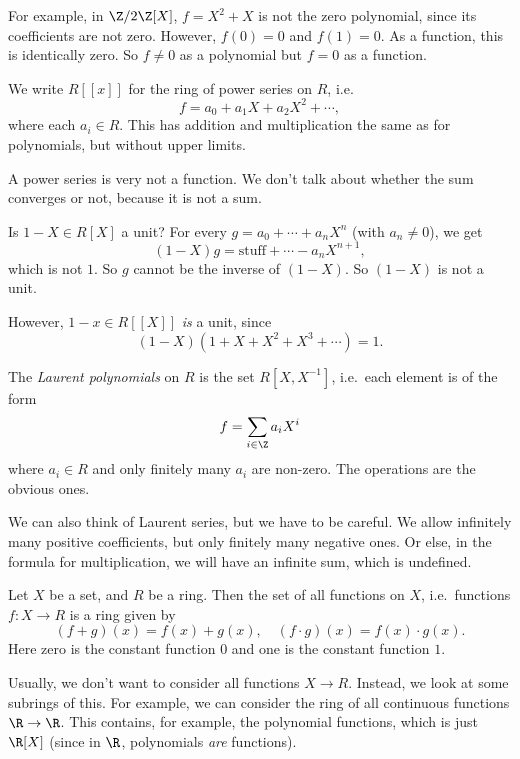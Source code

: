 \documentclass[a4paper]{article}
\begin{document}
For example, in $\Z/2\Z [X]$, $f = X^2 + X$ is not the zero polynomial, since its coefficients are not zero. However, $f(0) = 0$ and $f(1) = 0$. As a function, this is identically zero. So $f \not= 0$ as a polynomial but $f = 0$ as a function.

\begin{defi}
  We write $R[[x]]$ for the ring of power series on $R$, i.e.
  \[
    f = a_0 + a_1 X + a_2 X^2 + \cdots,
  \]
  where each $a_i \in R$. This has addition and multiplication the same as for polynomials, but without upper limits.
\end{defi}
A power series is very not a function. We don't talk about whether the sum converges or not, because it is not a sum.

\begin{eg}
  Is $1 - X \in R[X]$ a unit? For every $g = a_0 + \cdots + a_n X^n$ (with $a_n \not= 0$), we get
  \[
    (1 - X)g = \text{stuff} + \cdots - a_n X^{n + 1},
  \]
  which is not $1$. So $g$ cannot be the inverse of $(1 - X)$. So $(1 - X)$ is not a unit.

  However, $1 - x \in R[[X]]$ \emph{is} a unit, since
  \[
    (1 - X)(1 + X + X^2 + X^3 + \cdots) = 1.
  \]
\end{eg}

\begin{defi}
  The \emph{Laurent polynomials} on $R$ is the set $R[X, X^{-1}]$, i.e.\ each element is of the form
  \[
    f = \sum_{i \in \Z} a_i X^i
  \]
  where $a_i \in R$ and only finitely many $a_i$ are non-zero. The operations are the obvious ones.
\end{defi}
We can also think of Laurent series, but we have to be careful. We allow infinitely many positive coefficients, but only finitely many negative ones. Or else, in the formula for multiplication, we will have an infinite sum, which is undefined.

\begin{eg}
  Let $X$ be a set, and $R$ be a ring. Then the set of all functions on $X$, i.e.\ functions $f: X \to R$ is a ring given by
  \[
    (f + g)(x) = f(x) + g(x),\quad (f\cdot g)(x) = f(x) \cdot g(x).
  \]
  Here zero is the constant function $0$ and one is the constant function $1$.

  Usually, we don't want to consider all functions $X \to R$. Instead, we look at some subrings of this. For example, we can consider the ring of all continuous functions $\R \to \R$. This contains, for example, the polynomial functions, which is just $\R[X]$ (since in $\R$, polynomials \emph{are} functions).
\end{eg}
\end{document}
